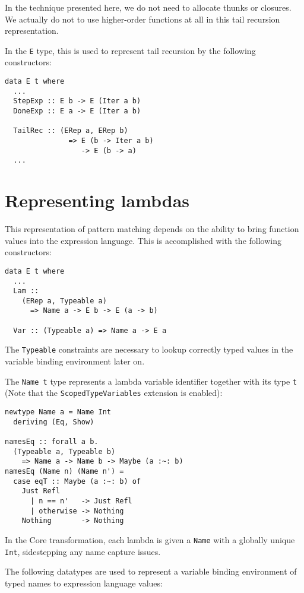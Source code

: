 \documentclass[sigplan,anonymous,review]{acmart}
\newcommand{\ttt}{\texttt}
\begin{document}
In the technique presented here, we do not need to allocate thunks or closures.
We actually do not to use higher-order functions at all in this tail recursion
representation.

In the \ttt{E} type, this is used to represent tail recursion by
the following constructors:

\begin{lstlisting}
data E t where
  ...
  StepExp :: E b -> E (Iter a b)
  DoneExp :: E a -> E (Iter a b)

  TailRec :: (ERep a, ERep b)
               => E (b -> Iter a b)
                  -> E (b -> a)
  ...
\end{lstlisting}

\section{Representing lambdas}
This representation of pattern matching depends on the ability to bring
function values into the expression language. This is accomplished
with the following constructors:

\begin{lstlisting}
data E t where
  ...
  Lam ::
    (ERep a, Typeable a)
      => Name a -> E b -> E (a -> b)

  Var :: (Typeable a) => Name a -> E a
\end{lstlisting}

The \ttt{Typeable} constraints are necessary to lookup correctly typed
values in the variable binding environment later on.

The \ttt{Name t} type represents a lambda variable identifier together with its
type \ttt{t} (Note that the \ttt{ScopedTypeVariables} extension is enabled):

\begin{lstlisting}
newtype Name a = Name Int
  deriving (Eq, Show)

namesEq :: forall a b.
  (Typeable a, Typeable b)
    => Name a -> Name b -> Maybe (a :~: b)
namesEq (Name n) (Name n') =
  case eqT :: Maybe (a :~: b) of
    Just Refl
      | n == n'   -> Just Refl
      | otherwise -> Nothing
    Nothing       -> Nothing
\end{lstlisting}

In the Core transformation, each lambda is given a \ttt{Name} with a globally
unique \ttt{Int}, sidestepping any name capture issues.

The following datatypes are used to represent a variable binding environment
of typed names to expression language values:
\end{document}
